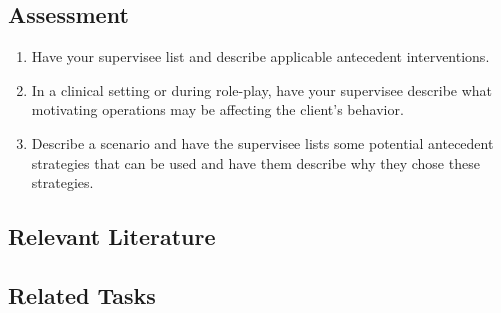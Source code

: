 \subsection{Assessment}
\begin{enumerate}
\item Have your supervisee list and describe applicable antecedent interventions.
\item In a clinical setting or during role-play, have your supervisee describe what motivating operations may be affecting the client's behavior.
\item Describe a scenario and have the supervisee lists some potential antecedent strategies that can be used and have them describe why they chose these strategies.
\end{enumerate}
%
\subsection{Relevant Literature}
\begin{refsection}
\nocite{test,alang2017police,clayton2018black}
\printbibliography[heading=none]
\end{refsection}
%
\subsection{Related Tasks} 
\foureNine{}\\
\fourFKTwentySix{}\\
\fourFKTwentySeven{}\\
\fourFKTwentyNine{}\\





\section{\foureTwo{}}
